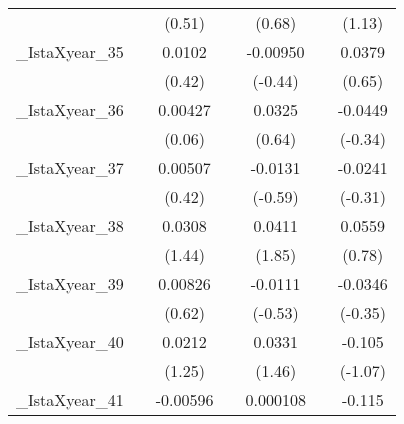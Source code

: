 {\begin{tabular}{l*{6}{c}}
            &                     &      (0.51)         &                     &      (0.68)         &                     &      (1.13)         \\
[1em]
\_IstaXyear\_35&                     &      0.0102         &                     &    -0.00950         &                     &      0.0379         \\
            &                     &      (0.42)         &                     &     (-0.44)         &                     &      (0.65)         \\
[1em]
\_IstaXyear\_36&                     &     0.00427         &                     &      0.0325         &                     &     -0.0449         \\
            &                     &      (0.06)         &                     &      (0.64)         &                     &     (-0.34)         \\
[1em]
\_IstaXyear\_37&                     &     0.00507         &                     &     -0.0131         &                     &     -0.0241         \\
            &                     &      (0.42)         &                     &     (-0.59)         &                     &     (-0.31)         \\
[1em]
\_IstaXyear\_38&                     &      0.0308         &                     &      0.0411         &                     &      0.0559         \\
            &                     &      (1.44)         &                     &      (1.85)         &                     &      (0.78)         \\
[1em]
\_IstaXyear\_39&                     &     0.00826         &                     &     -0.0111         &                     &     -0.0346         \\
            &                     &      (0.62)         &                     &     (-0.53)         &                     &     (-0.35)         \\
[1em]
\_IstaXyear\_40&                     &      0.0212         &                     &      0.0331         &                     &      -0.105         \\
            &                     &      (1.25)         &                     &      (1.46)         &                     &     (-1.07)         \\
[1em]
\_IstaXyear\_41&                     &    -0.00596         &                     &    0.000108         &                     &      -0.115         \\

\end{tabular}}
